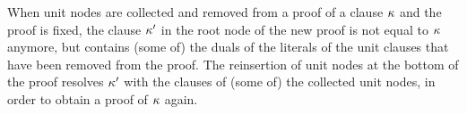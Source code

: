 \documentclass[envcountsame]{llncs}
\begin{document}

When unit nodes are collected and removed from a proof of a clause $\kappa$ and the
proof is fixed, the clause $\kappa'$ in the root node of the new proof is not equal
to $\kappa$ anymore, but contains (some of) the duals of the literals of the unit
clauses that have been removed from the proof. The reinsertion of unit nodes at
the bottom of the proof resolves $\kappa'$ with the clauses of (some of) the
collected unit nodes, in order to obtain a proof of $\kappa$ again.
%

\end{document}
